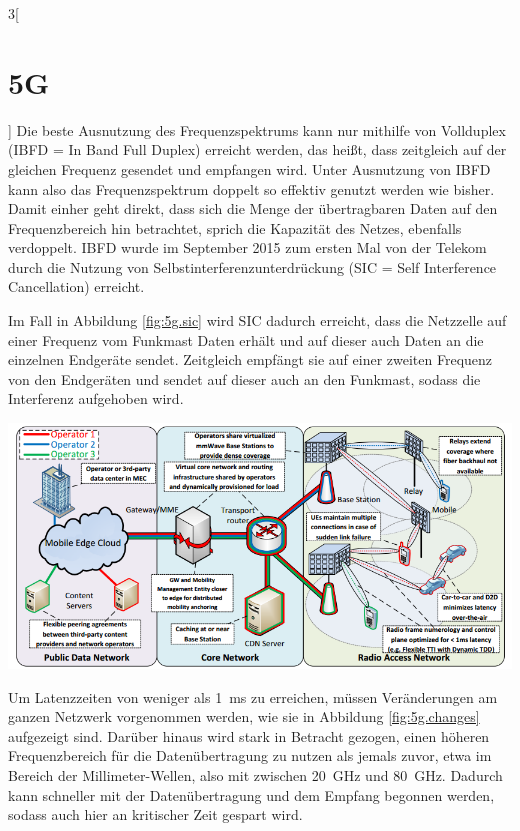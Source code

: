 \begin{multicols}{3}[\section{5G}]
Die beste Ausnutzung des Frequenzspektrums kann nur mithilfe von Vollduplex (IBFD = In Band Full Duplex) erreicht werden, das heißt, dass zeitgleich auf der gleichen Frequenz gesendet und empfangen wird.
Unter Ausnutzung von IBFD kann also das Frequenzspektrum doppelt so effektiv genutzt werden wie bisher. Damit einher geht direkt, dass sich die Menge der übertragbaren Daten auf den Frequenzbereich hin betrachtet, sprich die Kapazität des Netzes, ebenfalls verdoppelt.
IBFD wurde im September 2015 zum ersten Mal von der Telekom durch die Nutzung von Selbstinterferenzunterdrückung (SIC = Self Interference Cancellation) erreicht.

Im Fall in Abbildung \ref{fig:5g.sic} wird SIC dadurch erreicht, dass die Netzzelle auf einer Frequenz vom Funkmast Daten erhält und auf dieser auch Daten an die einzelnen Endgeräte sendet. Zeitgleich empfängt sie auf einer zweiten Frequenz von den Endgeräten und sendet auf dieser auch an den Funkmast, sodass die Interferenz aufgehoben wird.

\begin{Figure}
\includegraphics[width=\linewidth]{Kapitel/5G/Grafiken/5g-changes}
\label{fig:5g.changes}
\end{Figure}

Um Latenzzeiten von weniger als \SI{1}{\milli\second} zu erreichen, 
müssen Veränderungen am ganzen Netzwerk vorgenommen werden, wie sie in Abbildung \ref{fig:5g.changes} aufgezeigt sind.
Darüber hinaus wird stark in Betracht gezogen, einen höheren Frequenzbereich für die Datenübertragung zu nutzen als jemals zuvor, etwa im Bereich der Millimeter-Wellen, also mit zwischen \SI{20}{\giga\hertz} und \SI{80}{\giga\hertz}. Dadurch kann schneller mit der Datenübertragung und dem Empfang begonnen werden, sodass auch hier an kritischer Zeit gespart wird.

\end{multicols}
